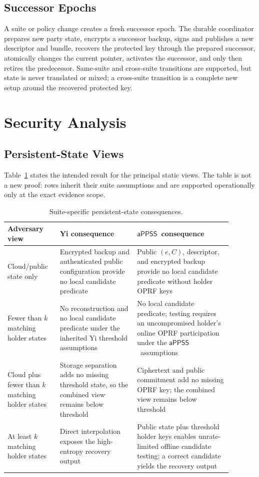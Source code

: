 \documentclass[sigconf,anonymous]{acmart}
\newcommand{\APPSS}{\ensuremath{\mathsf{aPPSS}}}
\begin{document}
\subsection{Successor Epochs}

A suite or policy change creates a fresh successor epoch. The durable
coordinator prepares new party state, encrypts a successor backup, signs and
publishes a new descriptor and bundle, recovers the protected key through the
prepared successor, atomically changes the current pointer, activates the
successor, and only then retires the predecessor. Same-suite and cross-suite
transitions are supported, but state is never translated or mixed; a
cross-suite transition is a complete new setup around the recovered protected
key.

\section{Security Analysis}
\label{sec:security}

\subsection{Persistent-State Views}

Table~\ref{tab:views} states the intended result for the principal static
views. The table is not a new proof: rows inherit their suite assumptions and
are supported operationally only at the exact evidence scope.

\begin{table}[t]
\centering
\caption{Suite-specific persistent-state consequences.}
\label{tab:views}
\footnotesize
\begin{tabular}{p{0.20\linewidth}p{0.31\linewidth}p{0.38\linewidth}}
\toprule
\textbf{Adversary view} & \textbf{Yi consequence} & \textbf{\APPSS\ consequence} \\
\midrule
Cloud/public state only & Encrypted backup and authenticated public
configuration provide no local candidate predicate & Public \((e,C)\),
descriptor, and encrypted backup provide no local candidate predicate without
holder OPRF keys \\
\addlinespace
Fewer than \(k\) matching holder states & No reconstruction and no local
candidate predicate under the inherited Yi threshold assumptions & No local
candidate predicate; testing requires an uncompromised holder's online OPRF
participation under the \APPSS\ assumptions \\
\addlinespace
Cloud plus fewer than \(k\) matching holder states & Storage separation adds
no missing threshold state, so the combined view remains below threshold &
Ciphertext and public commitment add no missing OPRF key; the combined view
remains below threshold \\
\addlinespace
At least \(k\) matching holder states & Direct interpolation exposes the
high-entropy recovery output & Public state plus threshold holder keys enables
unrate-limited offline candidate testing; a correct candidate yields the
recovery output \\
\bottomrule
\end{tabular}
\end{table}
\end{document}
